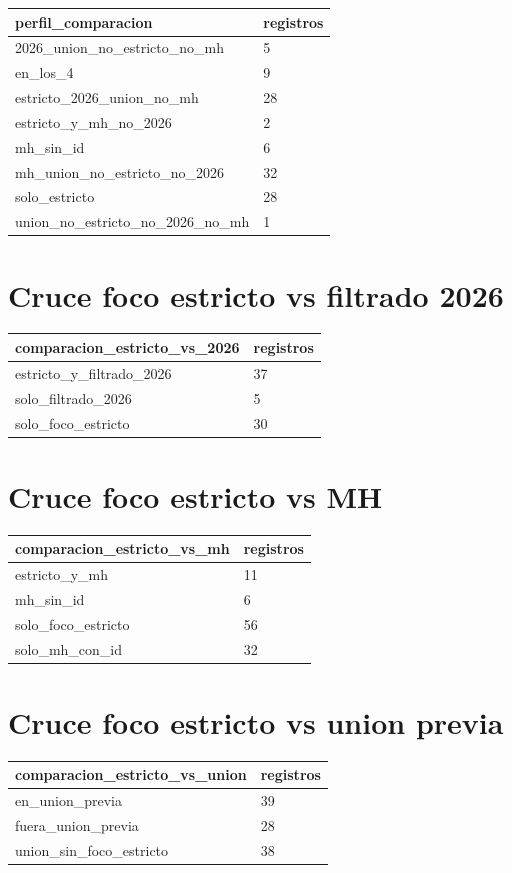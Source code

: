 \documentclass[11pt]{article}
\begin{document}
\begin{tabular}{ll}
\toprule
perfil\_comparacion & registros \\
\midrule
2026\_union\_no\_estricto\_no\_mh & 5 \\
en\_los\_4 & 9 \\
estricto\_2026\_union\_no\_mh & 28 \\
estricto\_y\_mh\_no\_2026 & 2 \\
mh\_sin\_id & 6 \\
mh\_union\_no\_estricto\_no\_2026 & 32 \\
solo\_estricto & 28 \\
union\_no\_estricto\_no\_2026\_no\_mh & 1 \\
\bottomrule
\end{tabular}

\section{Cruce foco estricto vs filtrado 2026}

\begin{tabular}{ll}
\toprule
comparacion\_estricto\_vs\_2026 & registros \\
\midrule
estricto\_y\_filtrado\_2026 & 37 \\
solo\_filtrado\_2026 & 5 \\
solo\_foco\_estricto & 30 \\
\bottomrule
\end{tabular}

\section{Cruce foco estricto vs MH}

\begin{tabular}{ll}
\toprule
comparacion\_estricto\_vs\_mh & registros \\
\midrule
estricto\_y\_mh & 11 \\
mh\_sin\_id & 6 \\
solo\_foco\_estricto & 56 \\
solo\_mh\_con\_id & 32 \\
\bottomrule
\end{tabular}

\section{Cruce foco estricto vs union previa}

\begin{tabular}{ll}
\toprule
comparacion\_estricto\_vs\_union & registros \\
\midrule
en\_union\_previa & 39 \\
fuera\_union\_previa & 28 \\
union\_sin\_foco\_estricto & 38 \\
\bottomrule
\end{tabular}
\end{document}
